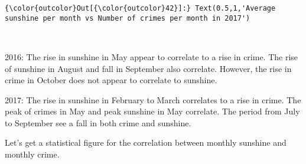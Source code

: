 \documentclass[11pt]{article}
\begin{document}
\begin{Verbatim}[commandchars=\\\{\}]
{\color{outcolor}Out[{\color{outcolor}42}]:} Text(0.5,1,'Average sunshine per month vs Number of crimes per month in 2017')
\end{Verbatim}
            
    \begin{center}
    \end{center}
    { \hspace*{\fill} \\}
    
     2016: The rise in sunshine in May appear to correlate to a rise in
crime. The rise of sunshine in August and fall in September also
correlate. However, the rise in crime in October does not appear to
correlate to sunshine.

2017: The rise in sunshine in February to March correlates to a rise in
crime. The peak of crimes in May and peak sunshine in May correlate. The
period from July to September see a fall in both crime and sunshine.

Let's get a statistical figure for the correlation between monthly
sunshine and monthly crime.
\end{document}
